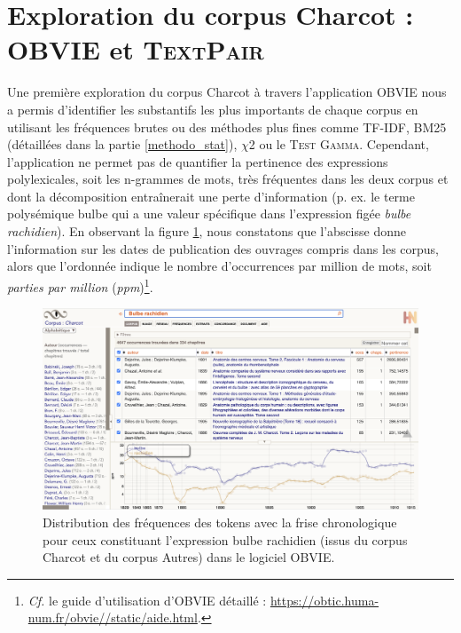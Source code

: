 \label{resultats}
\minitoc
\section{Exploration du corpus Charcot : \textsc{OBVIE} et \textsc{TextPair}}
Une première exploration du corpus Charcot à travers l'application OBVIE nous a permis d'identifier les substantifs les plus importants de chaque corpus en utilisant les fréquences brutes ou des méthodes plus fines comme \textsc{TF-IDF}, \textsc{BM25} (détaillées dans la partie \ref{methodo_stat}), \textsc{$\chi$2} ou le \textsc{Test Gamma}. Cependant, l'application ne permet pas de quantifier la pertinence des expressions polylexicales, soit les n-grammes de mots, très fréquentes dans les deux corpus et dont la décomposition entraînerait une perte d'information (p. ex. le terme polysémique \og{}bulbe\fg{} qui a une valeur spécifique dans l'expression figée \textit{bulbe rachidien}). En observant la figure \ref{fig:bulbe}, nous constatons que l'abscisse donne l'information sur les dates de publication des ouvrages compris dans les corpus, alors que l'ordonnée indique le nombre d'occurrences par million de mots, soit \textit{parties par million} (\textit{ppm})\footnote{\textit{Cf.} le guide d'utilisation d'\textsc{OBVIE} détaillé : \url{https://obtic.huma-num.fr/obvie//static/aide.html}.}. 
\begin{figure}[!ht]
    \centering
    \includegraphics[width=1\textwidth]{img/bulbe_rachidien_mini.png}
    \caption{Distribution des fréquences des tokens avec la frise chronologique pour ceux constituant l'expression \og{}bulbe rachidien\fg{} (issus du corpus \og{}Charcot\fg{} et du corpus \og{}Autres\fg{}) dans le logiciel OBVIE.
    }
    \label{fig:bulbe}
\end{figure}

